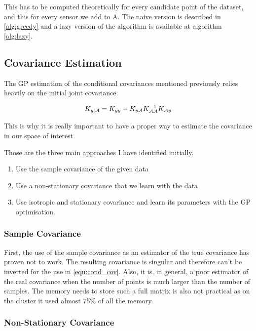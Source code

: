 This has to be computed theoretically for every candidate point of the dataset, and this for every sensor we add to A. The naive version is described in \ref{alg:greedy} and a lazy version of the algorithm is available at algorithm \ref{alg:lazy}.

\subsection{Covariance Estimation}

The GP estimation of the conditional covariances mentioned previously relies heavily on the initial joint covariance. 

\begin{equation}
    K_{y | \mathcal{A}} = K_{yy} - K_{y\mathcal{A}} K_{\mathcal{A}\mathcal{A}}^{-1} K_{\mathcal{A} y} \label{equ:cond_cov}
\end{equation}

This is why it is really important to have a proper way to estimate the covariance in our space of interest. 

Those are the three main approaches I have identified initially. 

\begin{enumerate}
    \item Use the sample covariance of the given data
    \item Use a non-stationary covariance that we learn with the data
    \item Use isotropic and stationary covariance and learn its parameters with the GP optimisation. 
\end{enumerate}

\subsubsection{Sample Covariance}
First, the use of the sample covariance as an estimator of the true covariance has proven not to work. The resulting covariance is singular and therefore can't be inverted for the use in \ref{equ:cond_cov}. Also, it is, in general, a poor estimator of the real covariance when the number of points is much larger than the number of samples. The memory needs to store such a full matrix is also not practical as on the cluster it used almost 75\% of all the memory. \\

\subsubsection{Non-Stationary Covariance}

